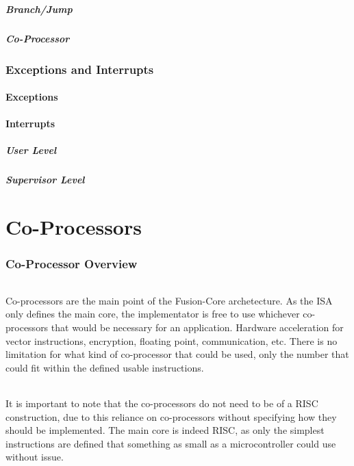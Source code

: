 \documentclass[letterpaper, 11pt]{article}
\begin{document}
\subsubsection{Branch/Jump}
\subsubsection{Co-Processor}



\section{Exceptions and Interrupts}
\subsection{Exceptions}


\subsection{Interrupts}
\subsubsection{User Level}
\subsubsection{Supervisor Level}

\clearpage
\part{Co-Processors}
\section{Co-Processor Overview}
\paragraph{}Co-processors are the main point of the Fusion-Core archetecture. As the ISA only defines the main core, the implementator is free to use
whichever co-processors that would be necessary for an application. Hardware acceleration for vector instructions, encryption, floating point, communication,
etc. There is no limitation for what kind of co-processor that could be used, only the number that could fit within the defined usable instructions.
\paragraph{}It is important to note that the co-processors do not need to be of a RISC construction, due to this reliance on co-processors without
specifying how they should be implemented. The main core is indeed RISC, as only the simplest instructions are defined that something as small as a microcontroller
could use without issue.
\end{document}
